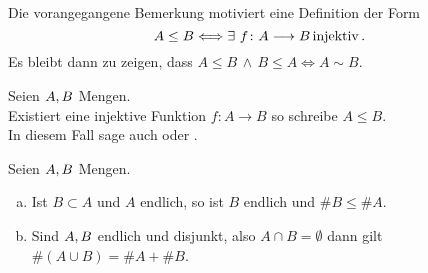 \documentclass[../ana1.tex]{subfiles}
\begin{document}
\begin{prosa}
	Die vorangegangene Bemerkung motiviert eine Definition der Form
	\[A \leq B \longeq \exists \, f \colon A \longrightarrow B \injektiv .\]
	Es bleibt dann zu zeigen, dass \(A \leq B \, \wedge \, B \leq A \iff A \sim B \).
\end{prosa}

\begin{defi*}
	Seien \(A , B \) Mengen. \\
	Existiert eine injektive Funktion \(f \colon A \longrightarrow B \) so schreibe \(A \leq B \). \\
	In diesem Fall sage auch  oder
	.
\end{defi*}

\begin{bem}
	Seien \(A , B \) Mengen.
	\begin{enumerate}[(a)]
		\item Ist \(B \subset A \) und \(A \) endlich, so ist \(B \) endlich und \( \#B \leq \# A \).
		\item Sind \(A , B \) endlich und disjunkt, also \(A \cap B = \emptyset \) dann gilt \\
			  \(\#(A \cup B) = \#A + \#B \).
	\end{enumerate}
\end{bem}
\end{document}
